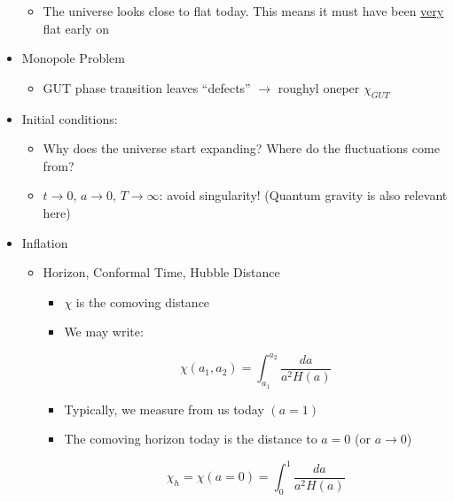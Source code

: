 \begin{itemize}
\begin{itemize}
      \item The universe looks close to flat today. This means it must have been \underline{very} flat early on

    \end{itemize}

  \item Monopole Problem

    \begin{itemize}

      \item GUT phase transition leaves ``defects'' $\to$ roughyl oneper $\chi_{GUT}$

    \end{itemize}

  \item Initial conditions: 

    \begin{itemize}

      \item Why does the universe start expanding? Where do the fluctuations come from?

      \item $t\to 0,\, a\to0,\, T\to\infty$: avoid singularity! (Quantum gravity is also relevant here)

    \end{itemize}

  \item Inflation

    \begin{itemize}

      \item Horizon, Conformal Time, Hubble Distance

        \begin{itemize}

          \item $\chi$ is the comoving distance

          \item We may write:

            $$\chi(a_1,a_2)=\int_{a_1}^{a_2}\frac{da}{a^2H(a)}$$

          \item Typically, we measure from us today $(a=1)$

          \item The comoving horizon today is the distance to $a=0$ (or $a\to0$)

            $$\chi_h=\chi(a=0)=\int_0^{1} \frac{da}{a^2H(a)}$$


\end{itemize}
\end{itemize}
\end{itemize}
